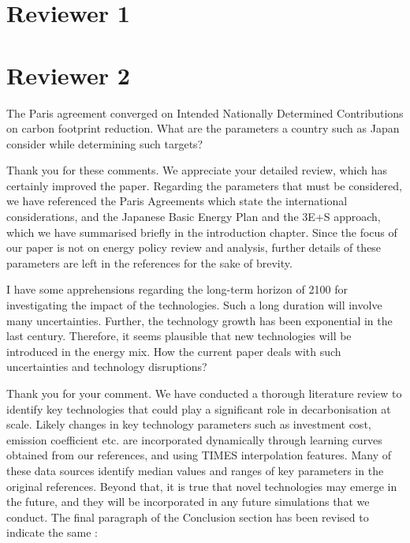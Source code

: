 \documentclass[answers,11pt]{exam}
\begin{document}
\begin{questions}
        \section*{Reviewer 1}

	
        \section*{Reviewer 2}

        \question The Paris agreement converged on Intended Nationally Determined Contributions on carbon footprint reduction. What are the parameters a country such as Japan consider while determining such targets?
        
        \begin{solution}
                Thank you for these comments. We appreciate your detailed review, which has certainly improved the paper. Regarding the parameters that must be considered, we have referenced the Paris Agreements which state the international considerations, and the Japanese Basic Energy Plan and the 3E+S approach, which we have summarised briefly in the introduction chapter. Since the focus of our paper is not on energy policy review and analysis, further details of these parameters are left in the references for the sake of brevity.
        \end{solution}


        \question I have some apprehensions regarding the long-term horizon of 2100 for investigating the impact of the technologies. Such a long duration will involve many uncertainties. Further, the technology growth has been exponential in the last century. Therefore, it seems plausible that new technologies will be introduced in the energy mix. How the current paper deals with such uncertainties and technology disruptions?
        
        \begin{solution}
                 Thank you for your comment. We have conducted a thorough literature review to identify key technologies that could play a significant role in decarbonisation at scale. Likely changes in key technology parameters such as investment cost, emission coefficient etc. are incorporated dynamically through learning curves obtained from our references, and using TIMES interpolation features. Many of these data sources identify median values and ranges of key parameters in the original references. Beyond that, it is true that novel technologies may emerge in the future, and they will be incorporated in any future simulations that we conduct. The final paragraph of the Conclusion section has been revised to indicate the same :
                 

\end{solution}
\end{questions}
\end{document}
